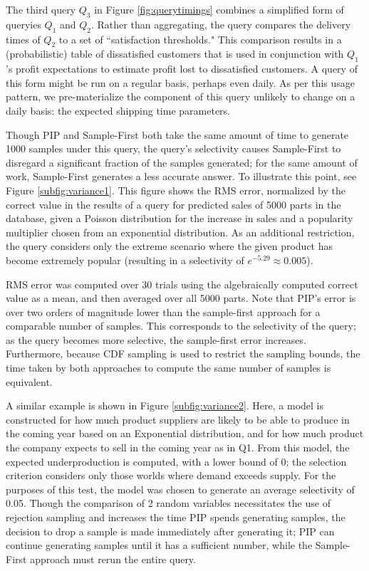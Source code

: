The third query $Q_3$ in Figure \ref{fig:querytimings} combines a simplified form of queryies $Q_1$ and $Q_2$.  Rather than aggregating, the query compares the delivery times of $Q_2$ to a set of ``satisfaction thresholds."  This comparison results in a (probabilistic) table of dissatisfied customers that is used in conjunction with $Q_1$'s profit expectations to estimate profit lost to dissatisfied customers.  A query of this form might be run on a regular basis, perhaps even daily.  As per this usage pattern, we pre-materialize the component of this query unlikely to change on a daily basis: the expected shipping time parameters.


Though PIP and Sample-First both take the same amount of time to generate 1000 samples under this query, the query's selectivity causes Sample-First to disregard a significant fraction of the samples generated; for the same amount of work, Sample-First generates a less accurate answer.  To illustrate this point, see Figure \ref{subfig:variance1}.  This figure shows the RMS error, normalized by the correct value in the results of a query for predicted sales of 5000 parts in the database, given a Poisson distribution for the increase in sales and a popularity multiplier chosen from an exponential distribution.  As an additional restriction, the query considers only the extreme scenario where the given product has become extremely popular (resulting in a selectivity of $e^{-5.29} \approx 0.005$).  

RMS error was computed over 30 trials using the algebraically computed correct value as a mean, and then averaged over all 5000 parts.  Note that PIP's error is over two orders of magnitude lower than the sample-first approach for a comparable number of samples.  This corresponds to the selectivity of the query; as the query becomes more selective, the sample-first error increases.  Furthermore, because CDF sampling is used to restrict the sampling bounds, the time taken by both approaches to compute the same number of samples is equivalent.

A similar example is shown in Figure \ref{subfig:variance2}.  Here, a model is constructed for how much product suppliers are likely to be able to produce in the coming year based on an Exponential distribution, and for how much product the company expects to sell in the coming year as in Q1.  From this model, the expected underproduction is computed, with a lower bound of 0; the selection criterion considers only those worlds where demand exceeds supply.  For the purposes of this test, the model was chosen to generate an average selectivity of 0.05.  Though the comparison of 2 random variables necessitates the use of rejection sampling and increases the time PIP spends generating samples, the decision to drop a sample is made immediately after generating it; PIP can continue generating samples until it has a sufficient number, while the Sample-First approach must rerun the entire query.

